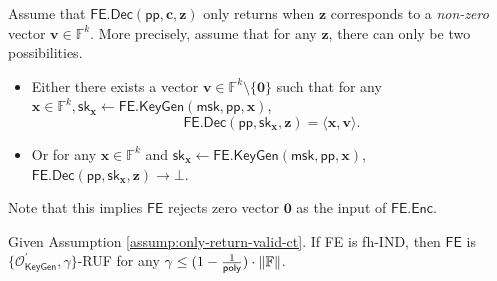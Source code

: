 \begin{assumption}
\label{assump:only-return-valid-ct}
Assume that $\textsf{FE.Dec}(\textsf{pp}, \mathbf{c}, \mathbf{z})$ only returns when $\mathbf{z}$ corresponds to a \emph{non-zero} vector $\mathbf{v} \in \mathbb{F}^k$. More precisely, assume that for any $\mathbf{z}$, there can only be two possibilities.

\begin{itemize}
	\item Either there exists a vector $\mathbf{v} \in \mathbb{F}^k \setminus \{\mathbf{0}\}$ such that for any $\mathbf{x} \in \mathbb{F}^k, \textsf{sk}_{\mathbf{x}} \gets \textsf{FE.KeyGen}(\textsf{msk}, \textsf{pp}, \mathbf{x})$, 
	\[
		\textsf{FE.Dec}(\textsf{pp}, \textsf{sk}_{\mathbf{x}}, \mathbf{z}) = \langle \mathbf{x}, \mathbf{v} \rangle.
	\]
	\item Or for any $\mathbf{x} \in \mathbb{F}^k$ and $\textsf{sk}_{\mathbf{x}} \gets \textsf{FE.KeyGen}(\textsf{msk}, \textsf{pp}, \mathbf{x})$, $\textsf{FE.Dec}(\textsf{pp}, \textsf{sk}_{\mathbf{x}}, \mathbf{z}) \to \bot$.

\end{itemize}
Note that this implies $\textsf{FE}$ rejects zero vector $\mathbf{0}$ as the input of $\textsf{FE.Enc}$.
\end{assumption}

\begin{theorem}
\label{thm:fh-IPFE:ind-OKeyGen-gamma-ruf}
Given Assumption \ref{assump:only-return-valid-ct}. If \textsf{FE} is fh-IND, then $\textsf{FE}$ is $\{ \mathcal{O}^\prime_{\textsf{KeyGen}}, \gamma \}$-RUF for any $\gamma \leq (1 - \frac{1}{\mathsf{poly}}) \cdot \|\mathbb{F}\|$.

\end{theorem}

